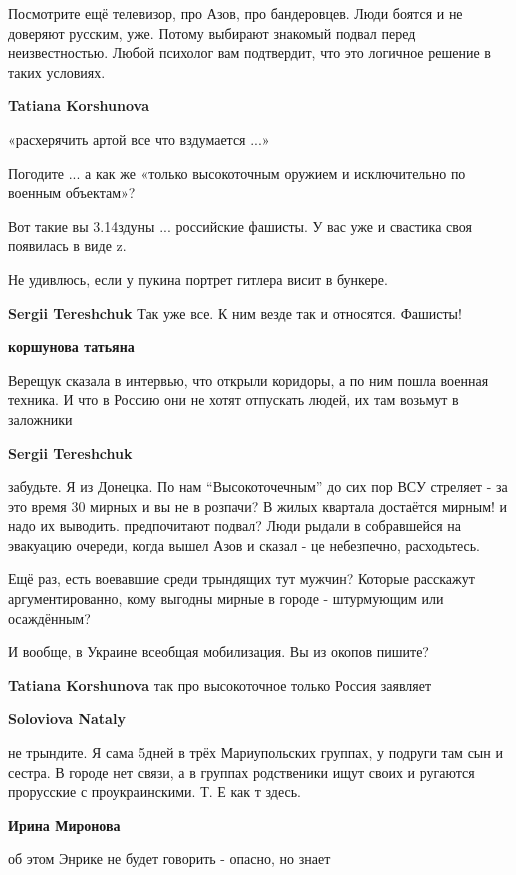 \begin{itemize}
\begin{itemize}
Посмотрите ещё телевизор, про Азов, про бандеровцев. Люди боятся и не доверяют
русским, уже. Потому выбирают знакомый подвал перед неизвестностью. Любой
психолог вам подтвердит, что это логичное решение в таких условиях.

\textbf{Tatiana Korshunova} 

«расхерячить артой все что вздумается ...»

Погодите ... а как же «только высокоточным оружием и исключительно по военным
объектам»?

Вот такие вы 3.14здуны ... российские фашисты. У вас уже и свастика своя
появилась в виде z.

Не удивлюсь, если у пукина портрет гитлера висит в бункере.

\textbf{Sergii Tereshchuk} Так уже все. К ним везде так и относятся. Фашисты!

\textbf{коршунова татьяна} 

Верещук сказала в интервью, что открыли коридоры, а по ним пошла военная
техника. И что в Россию они не хотят отпускать людей, их там возьмут в
заложники

\textbf{Sergii Tereshchuk} 

забудьте. Я из Донецка. По нам \enquote{Высокоточечным} до сих пор ВСУ стреляет - за это
время 30 мирных и вы не в розпачи? В жилых квартала достаётся мирным! и надо их
выводить. предпочитают подвал? Люди рыдали в собравшейся на эвакуацию очереди,
когда вышел Азов и сказал - це небезпечно, расходьтесь.


Ещё раз, есть воевавшие среди трындящих тут мужчин? Которые расскажут
аргументированно, кому выгодны мирные в городе - штурмующим или осаждённым?

И вообще, в Украине всеобщая мобилизация. Вы из окопов пишите?

\textbf{Tatiana Korshunova} так про высокоточное только Россия заявляет

\textbf{Soloviova Nataly} 

не трындите. Я сама 5дней в трёх Мариупольских группах, у подруги там сын и
сестра. В городе нет связи, а в группах родственики ищут своих и ругаются
прорусские с проукраинскими. Т. Е как т здесь.

\textbf{Ирина Миронова} 

об этом Энрике не будет говорить - опасно, но знает


\end{itemize}
\end{itemize}
